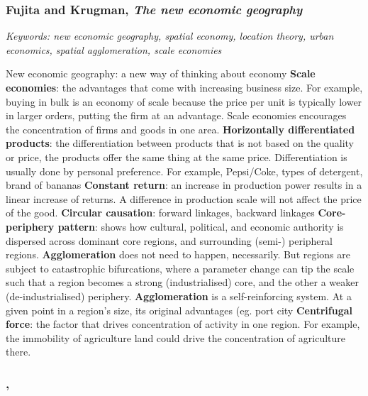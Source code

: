 \documentclass{article}
\begin{document}
\subsubsection{Fujita and Krugman, \textit{The new economic geography}}

\textit{Keywords: new economic geography, spatial economy, location theory, urban economics, spatial agglomeration, scale economies}

\begin{outline}
	\1 New economic geography: a new way of thinking about economy
	\1 \textbf{Scale economies}: the advantages that come with increasing business size. For example, buying in bulk is an economy of scale because the price per unit is typically lower in larger orders, putting the firm at an advantage.
Scale economies encourages the concentration of firms and goods in one area. 
	\1 \textbf{Horizontally differentiated products}: the differentiation between products that is not based on the quality or price, the products offer the same thing at the same price. Differentiation is usually done by personal preference. For example, Pepsi/Coke, types of detergent, brand of bananas
	\1 \textbf{Constant return}: an increase in production power results in a linear increase of returns. A difference in production scale will not affect the price of the good. 
	\1 \textbf{Circular causation}: forward linkages, backward linkages
	\1 \textbf{Core-periphery pattern}: shows how cultural, political, and economic authority is dispersed across dominant core regions, and surrounding (semi-) peripheral regions.
	\1 \textbf{Agglomeration} does not need to happen, necessarily. But regions are subject to catastrophic bifurcations, where a parameter change can tip the scale such that a region becomes a strong (industrialised) core, and the other a weaker (de-industrialised) periphery.
	\1 \textbf{Agglomeration} is a self-reinforcing system. At a given point in a region's size, its original advantages (eg. port city
	\1 \textbf{Centrifugal force}: the factor that drives concentration of activity in one region. For example, the immobility of agriculture land could drive the concentration of agriculture there.
\end{outline}




\begin{outline}
	\1
\end{outline}

\subsubsection{, \textit{}}

\fi
\end{document}
